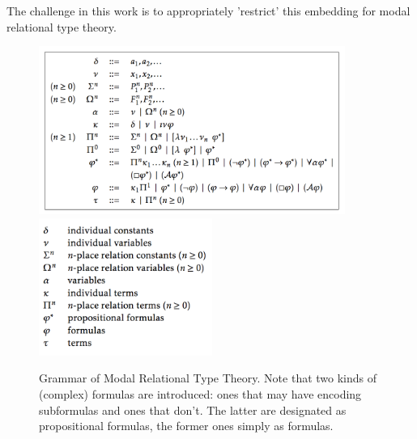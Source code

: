 \begin{isabellebody}
\begin{isamarkuptext}
 The challenge in this work is to appropriately 'restrict' this embedding for modal relational type theory.
  \begin{figure}[t]
 \includegraphics[height=5.5cm]{ModalRelationalTypeTheory.png}\includegraphics[height=4.5cm]{ModalRelationalTypeTheory2.png}
 \caption{Grammar of Modal Relational Type Theory. \label{mmrt}
 Note that two kinds of (complex) formulas are introduced: ones that may have encoding subformulas and ones that don’t.
 The latter are designated as propositional formulas, the former ones simply as formulas. }
 \end{figure}



\end{isamarkuptext}
\end{isabellebody}
